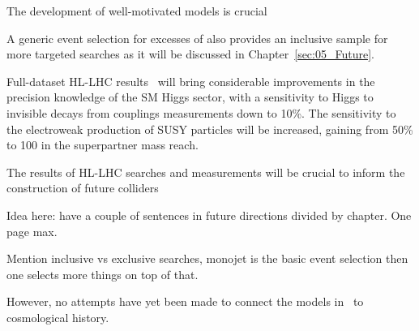 
The development of well-motivated models is crucial 

A generic event selection for excesses of \MET also provides an inclusive sample for more targeted searches as it will be discussed in Chapter~\ref{sec:05_Future}. 

Full-dataset HL-LHC results~\cite{Campana:2016cqm} will bring considerable improvements in the precision knowledge of the SM Higgs sector, with a sensitivity to Higgs to invisible decays from couplings measurements down to 10\%. %
The sensitivity to the electroweak production of SUSY particles will be increased, gaining from 50\% to 100\? in the superpartner mass reach. %

The results of HL-LHC searches and measurements will be crucial to inform the construction of future colliders

\cite{Ilten:2016tkc} %
\cite{Ilten:2018crw} %
\cite{Golling:2016gvc} %
\cite{Liu:2017zdh} %


Idea here: have a couple of sentences in future directions divided by chapter. One page max. 

Mention inclusive vs exclusive searches, monojet is the basic event selection then one selects more things on top of that. 


However, no attempts have yet been made to connect the models in~\cite{Buchmueller:2017uqu} to cosmological history. 

